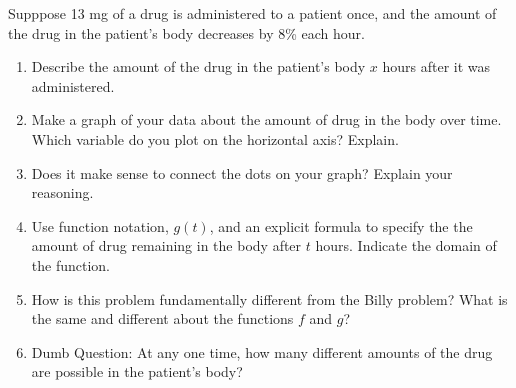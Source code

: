 \begin{prob}
Supppose 13 mg of a drug is administered to a patient once, and the amount of the drug in the patient's body decreases by 8\% each hour.  
\begin{enumerate}
\item Describe the amount of the drug in the patient's body $x$ hours after it was administered.  

\item Make a graph of your data about the amount of drug in the body over time.  Which variable do you plot on the horizontal axis?  Explain.  

\item Does it make sense to connect the dots on your graph?  Explain your reasoning.  

\item Use function notation, $g(t)$, and an explicit formula to specify the the amount of drug remaining in the body after $t$ hours.  Indicate the domain of the function. 

\item How is this problem fundamentally different from the Billy problem?  What is the same and different about the functions $f$ and $g$?  

\item Dumb Question:  At any one time, how many different amounts of the drug are possible in the patient's body?
\end{enumerate}
\end{prob}
